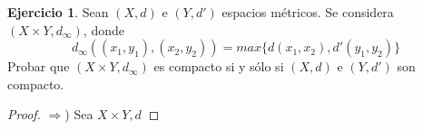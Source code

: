 \documentclass[12pt]{article}
\newcommand{\Ra}{\Rightarrow}
\theoremstyle{definition}
\newtheorem{ej}{Ejercicio}
\begin{document}
\begin{ej}
	Sean $(X,d)$ e $(Y,d')$ espacios métricos. Se considera $(X \times Y , d_{\infty})$, donde
	$$ d_{\infty}((x_1,y_1),(x_2,y_2)) = max \{d(x_1,x_2),d'(y_1,y_2)\} $$
Probar que $(X\times Y,d_{\infty})$ es compacto si y sólo si $(X,d)$ e $(Y,d')$ son compacto.

\begin{proof}
	$\Ra$) Sea $X \times Y, d_{}$ 
	
	
\end{proof}
\end{ej}
\end{document}
